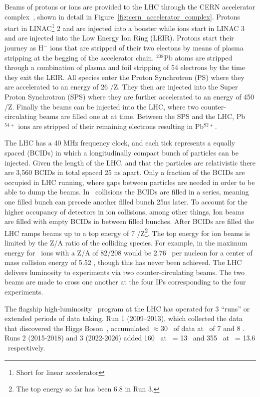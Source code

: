 Beams of protons or ions are provided to the LHC through the CERN accelerator complex~\cite{LHC:Design}, shown in detail in Figure~\ref{fig:cern_accelerator_complex}.
Protons start in LINAC\footnote{Short for linear accelerator} 2 and are injected into a booster while ions start in LINAC 3 and are injected into the Low Energy Ion Ring (LEIR).
Protons start their journey as H$^{-}$ ions that are stripped of their two electons by means of plasma stripping at the begging of the accelerator chain.
${}^{208}$Pb atoms are stripped through a combination of plasma and foil stripping of 54 electrons by the time they exit the LEIR.
All species enter the Proton Synchrotron (PS) where they are accelerated to an energy of 26 \GeV/Z.
They then are injected into the Super Proton Synchrotron (SPS) where they are further accelerated to an energy of 450 \GeV/Z.
Finally the beams can be injected into the LHC, where two counter-circulating beams are filled one at at time.
Between the SPS and the LHC, Pb${}^{54+}$ ions are stripped of their remaining electrons resulting in Pb${}^{82+}$.

The LHC has a 40 MHz frequency clock, and each tick represents a equally spaced  (BCIDs) in which a longitudinally compact bunch of particles can be injected.
Given the length of the LHC, and that the particles are relativistic there are 3,560 BCIDs in total spaced 25 ns apart.
Only a fraction of the BCIDs are occupied in LHC running, where gaps between particles are needed in order to be able to dump the beams.
In \pxp\ collisions the BCIDs are filled in a series, meaning one filled bunch can precede another filled bunch 25ns later.
To account for the higher occupancy of detectors in ion collisions, among other things, Ion beams are filled with empty BCIDs in between filled bunches.
After BCIDs are filled the LHC ramps beams up to a top energy of 7 \TeV/Z\footnote{The top energy so far has been 6.8 \TeV in Run 3.}.
The top energy for ion beams is limited by the Z/A ratio of the colliding species.
For example, in the maximum energy for \PbxPb\ ions with a Z/A of 82/208 would be 2.76 \TeV\ per nucleon for a center of mass collision energy of 5.52 \TeV, though this has never been achieved.
The LHC delivers luminosity to experiments via two counter-circulating beams.
The two beams are made to cross one another at the four IPs corresponding to the four experiments.

The flagship high-luminosity \pxp\ program at the LHC has operated for 3 ``runs'' or extended periods of data taking.  Run 1 (2009--2013), which collected the data that discovered the Higgs Boson~\cite{HIGG-2012-27,CMS-HIG-13-001}, accumulated $\approx$30 \FB\ of data at \Spp\ of 7 and 8 \TeV.
Runs 2 (2015-2018) and 3 (2022-2026) added 160 \FB\ at \Spp\ = 13 \TeV\ and 355 \FB\ at \Spp\ = 13.6 \TeV\ respectively.

